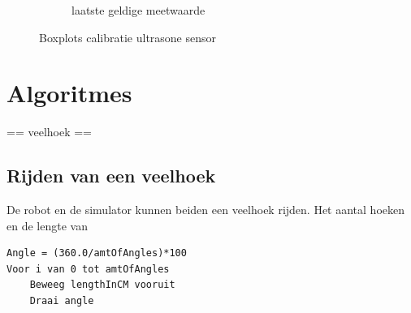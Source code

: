 \documentclass[eind]{penoverslag}
\begin{document}
\begin{figure}
\begin{subfigure}[h]{0.31\textwidth}
                \caption{laatste geldige meetwaarde}
        \end{subfigure}
 \caption{Boxplots calibratie ultrasone sensor}
\label{fig:calibUS}
\end{figure}



\section{Algoritmes} %
\label{sec:algo}
 == veelhoek == %
\subsection{Rijden van een veelhoek} %
\label{ssec:algoVeelH}
De robot en de simulator kunnen beiden een veelhoek rijden. Het aantal hoeken en de lengte van %

\lstset{frame=single, language=Java, caption=Veelhoek algoritme (pseudocode),
   	label=code:algoVeelH, numbers=left, numberstyle=\footnotesize,
		basicstyle=\sffamily, numbersep=5pt}
\begin{lstlisting}
Angle = (360.0/amtOfAngles)*100
Voor i van 0 tot amtOfAngles
	Beweeg lengthInCM vooruit
	Draai angle
\end{lstlisting}
\end{document}
